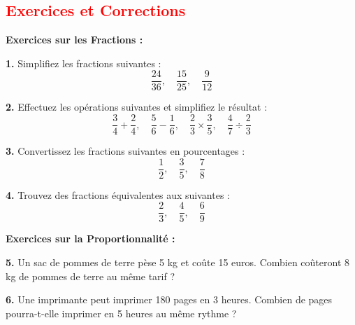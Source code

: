 \documentclass{article}
\begin{document}
\vspace{0.25cm}

\subsection{\textcolor{red}{ Exercices et Corrections}}

\begin{tcolorbox}[colback=yellow!10!white, colframe=yellow!75!black, title=\textcolor{white}{\textbf{Exercices}}, sharp corners=south, boxrule=0.8mm]
    
    \textbf{Exercices sur les Fractions :}
    
    \vspace{5pt}
    
    \textbf{1.} Simplifiez les fractions suivantes :
    \[
    \frac{24}{36}, \quad \frac{15}{25}, \quad \frac{9}{12}
    \]
    
    \vspace{10pt}
    
    \textbf{2.} Effectuez les opérations suivantes et simplifiez le résultat :
    \[
    \frac{3}{4} + \frac{2}{4}, \quad \frac{5}{6} - \frac{1}{6}, \quad \frac{2}{3} \times \frac{3}{5}, \quad \frac{4}{7} \div \frac{2}{3}
    \]
    
    \vspace{10pt}
    
    \textbf{3.} Convertissez les fractions suivantes en pourcentages :
    \[
    \frac{1}{2}, \quad \frac{3}{5}, \quad \frac{7}{8}
    \]
    
    \vspace{10pt}
    
    \textbf{4.} Trouvez des fractions équivalentes aux suivantes :
    \[
    \frac{2}{3}, \quad \frac{4}{5}, \quad \frac{6}{9}
    \]
    
    \vspace{20pt}
    
    \textbf{Exercices sur la Proportionnalité :}
    
    \vspace{5pt}
    
    \textbf{5.} Un sac de pommes de terre pèse 5 kg et coûte 15 euros. Combien coûteront 8 kg de pommes de terre au même tarif ?
    
    \vspace{10pt}
    
    \textbf{6.} Une imprimante peut imprimer 180 pages en 3 heures. Combien de pages pourra-t-elle imprimer en 5 heures au même rythme ?
    

\end{tcolorbox}
\end{document}
